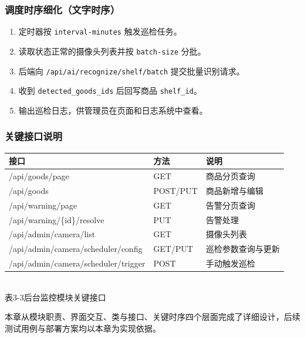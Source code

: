 \subsubsection{调度时序细化（文字时序）}
\begin{enumerate}[leftmargin=2em]
  \item 定时器按 \texttt{interval-minutes} 触发巡检任务。
  \item 读取状态正常的摄像头列表并按 \texttt{batch-size} 分批。
  \item 后端向 \texttt{/api/ai/recognize/shelf/batch} 提交批量识别请求。
  \item 收到 \texttt{detected\_goods\_ids} 后回写商品 \texttt{shelf\_id}。
  \item 输出巡检日志，供管理员在页面和日志系统中查看。
\end{enumerate}

\subsubsection{关键接口说明}
\begin{center}
  \renewcommand{\arraystretch}{1.35}
  \begin{tabular}{|>{\centering\arraybackslash}m{3.6cm}|>{\centering\arraybackslash}m{2.2cm}|>{\centering\arraybackslash}m{6.4cm}|}
    \hline
    \textbf{接口} & \textbf{方法} & \textbf{说明} \\ \hline
    /api/goods/page & GET & 商品分页查询 \\ \hline
    /api/goods & POST/PUT & 商品新增与编辑 \\ \hline
    /api/warning/page & GET & 告警分页查询 \\ \hline
    /api/warning/\{id\}/resolve & PUT & 告警处理 \\ \hline
    /api/admin/camera/list & GET & 摄像头列表 \\ \hline
    /api/admin/camera/scheduler/config & GET/PUT & 巡检参数查询与更新 \\ \hline
    /api/admin/camera/scheduler/trigger & POST & 手动触发巡检 \\ \hline
  \end{tabular}
  \\[0.3em]
  {表3-3\quad 后台监控模块关键接口}
\end{center}

本章从模块职责、界面交互、类与接口、关键时序四个层面完成了详细设计，后续测试用例与部署方案均以本章为实现依据。
